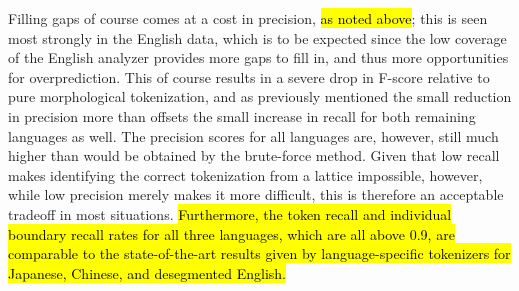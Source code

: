 Filling gaps of course comes at a cost in precision, \hl{as noted above}; this is seen most strongly in the English data, which is to be expected since the low coverage of the English analyzer provides more gaps to fill in, and thus more opportunities for overprediction. This of course results in a severe drop in F-score relative to pure morphological tokenization, and as previously mentioned the small reduction in precision more than offsets the small increase in recall for both remaining languages as well. The precision scores for all languages are, however, still much higher than would be obtained by the brute-force method. Given that low recall makes identifying the correct tokenization from a lattice impossible, however, while low precision merely makes it more difficult, this is therefore an acceptable tradeoff in most situations. \hl{Furthermore, the token recall and individual boundary recall rates for all three languages, which are all above 0.9, are comparable to the state-of-the-art results given by language-specific tokenizers for Japanese, Chinese, and desegmented English.}